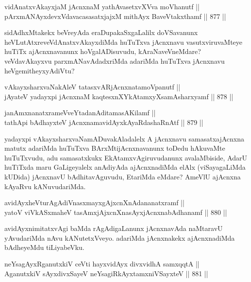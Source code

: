 \begin{shl}
vidAnatxvAkayxjaM jAcnxnaM yathAvasetxvXVva moVhanutf || \\
pArxmANAyxdevxVdavacasasatxjajxM mithAyx BaveVtakxthamf \hfill || 877 ||  
\end{shl}

\begin{artha}
sidAdhxMtakekx beVreyAda eraDupakaSxgaLalilx doVSavanunx heVLutAtxre\ndash  veVdAnatxvAkayxdiMda huTuTxva jAcnxnavu vasutxviruvaMteye huTiTx ajAcnxnavanunx hoVgalADisuvudu, kAraNaveVneMdare? veVdavAkayxvu parxmANavAdadxriMda adariMda huTuTxva jAcnxnavu heVge\break mitheyxyAdiVtu?
\end{artha}


\begin{shl}
vAkayxsharxvaNakAleV tatasxvARjAcnxnatamoVpanutf || \\
jAyateV yadayxpi jAcnxnaM kaqtesxnXYkAtamxyXsamAsharxyamf \hfill || 878 ||  
\end{shl}
				
\begin{shl}
janAmxnanatxrameVveYtadanAditamasA\s Kilamf || \\
tathA\s pi bAdhayxteV jAcnxnamavidAyxkAyaRdashaRnAtf \hfill || 879 ||  
\end{shl}

\begin{artha}
yadayxpi vAkayxsharxvaNamADuvakAladalelx A jAcnxnavu samasatxajAcnxna matutx adariMda huTuTxva BArxMtijAcnxnavanunx toDedu hAkuvaMte huTuTxvudu, adu samasatxkukx EkAtamxvAgiruvudanunx avalaMbiside, AdarU huTiTxda maru GaLigeyalelx anAdiyAda ajAcnxnadiMda elAlx (viSayagaLiMda kUDida) jAcnxnavU bAdhitavAguvudu, EtariMda eMdare? AmeVlU ajAcnxna kAyaRvu kANuvudariMda.
\end{artha}

\begin{shl}
avidAyxheVturAgAdiVnasxmayxgAjxcnXnAdananatxramf || \\
yatoV viVkASxmaheV tasAmxjAjxcnXnasAyxjAcnxnabAdhanamf \hfill || 880 ||  
\end{shl}

\begin{artha}
avidAyxnimitatxvAgi baMda rAgAdigaLanunx jAcnxnavAda naMtaravU yAvudariMda nAvu kANutetxVveyo. adariMda jAcnxnakekx ajAcnxnadiMda bAdheyeMdu tiLiyabeVku.
\end{artha}

\begin{shl}
neYsagAyxRganutxkiV ceVti hayxvidAyx divxvidhA samxqqtA || \\
AganutxkiV sAyxdivxSayeV neYsagiRkAyxtamxniVSayxteV \hfill || 881 ||  
\end{shl}

